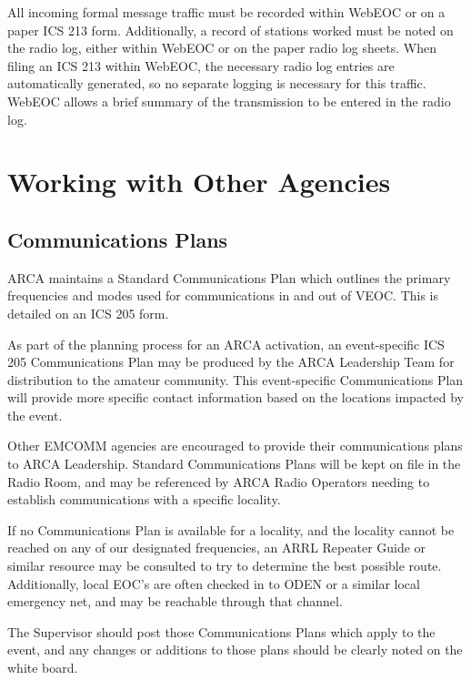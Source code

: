 \documentclass[pdflatex,letterpaper,twoside,12pt]{book}
\begin{document}
All incoming formal message traffic must be recorded within WebEOC or on a paper ICS 213 form.  Additionally, a record of stations worked must be noted on the radio log, either within WebEOC or on the paper radio log sheets.  When filing an ICS 213 within WebEOC, the necessary radio log entries are automatically generated, so no separate logging is necessary for this traffic.  WebEOC allows a brief summary of the transmission to be entered in the radio log.

\section{Working with Other Agencies}

\subsection{Communications Plans}

ARCA maintains a Standard Communications Plan which outlines the primary frequencies and modes used for communications in and out of VEOC.  This is detailed on an ICS 205 form.

As part of the planning process for an ARCA activation, an event-specific ICS 205 Communications Plan may be produced by the ARCA Leadership Team for distribution to the amateur community.  This event-specific Communications Plan will provide more specific contact information based on the locations impacted by the event.

Other EMCOMM agencies are encouraged to provide their communications plans to ARCA Leadership.  Standard Communications Plans will be kept on file in the Radio Room, and may be referenced by ARCA Radio Operators needing to establish communications with a specific locality.

If no Communications Plan is available for a locality, and the locality cannot be reached on any of our designated frequencies, an ARRL Repeater Guide or similar resource may be consulted to try to determine the best possible route.  Additionally, local EOC's are often checked in to ODEN or a similar local emergency net, and may be reachable through that channel.

The Supervisor should post those Communications Plans which apply to the event, and any changes or additions to those plans should be clearly noted on the white board.

\end{document}
